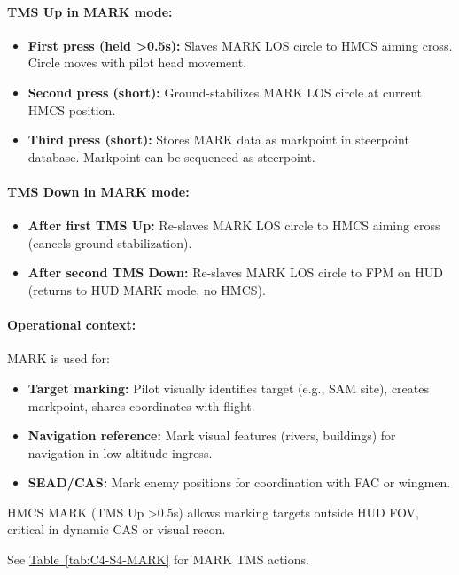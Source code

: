 \documentclass[11pt, a4paper, twoside]{report}
\newcommand{\tabref}[1]{\hyperref[#1]{Table~\ref*{#1}}}
\begin{document}
\paragraph{TMS Up in MARK mode:}
\begin{itemize}
    \item \textbf{First press (held >0.5s):} Slaves MARK LOS circle to HMCS aiming cross. Circle moves with pilot head movement.
    \item \textbf{Second press (short):} Ground-stabilizes MARK LOS circle at current HMCS position.
    \item \textbf{Third press (short):} Stores MARK data as markpoint in steerpoint database. Markpoint can be sequenced as steerpoint.
\end{itemize}

\paragraph{TMS Down in MARK mode:}
\begin{itemize}
    \item \textbf{After first TMS Up:} Re-slaves MARK LOS circle to HMCS aiming cross (cancels ground-stabilization).
    \item \textbf{After second TMS Down:} Re-slaves MARK LOS circle to FPM on HUD (returns to HUD MARK mode, no HMCS).
\end{itemize}

\paragraph{Operational context:}
MARK is used for:
\begin{itemize}
    \item \textbf{Target marking:} Pilot visually identifies target (e.g., SAM site), creates markpoint, shares coordinates with flight.
    \item \textbf{Navigation reference:} Mark visual features (rivers, buildings) for navigation in low-altitude ingress.
    \item \textbf{SEAD/CAS:} Mark enemy positions for coordination with FAC or wingmen.
\end{itemize}

HMCS MARK (TMS Up >0.5s) allows marking targets outside HUD FOV, critical in dynamic CAS or visual recon.

See \tabref{tab:C4-S4-MARK} for MARK TMS actions.

\end{document}
